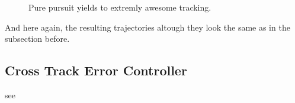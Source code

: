 \begin{figure}[h]
    \centering
    \def\svgwidth{\columnwidth}
    
    \caption{Pure pursuit yields to extremly awesome tracking.}
    \label{fig:purePursuit}
\end{figure}

And here again, the resulting trajectories altough they look the same as in the subsection before.

%




\subsection{Cross Track Error Controller}
see \cite{williams}

